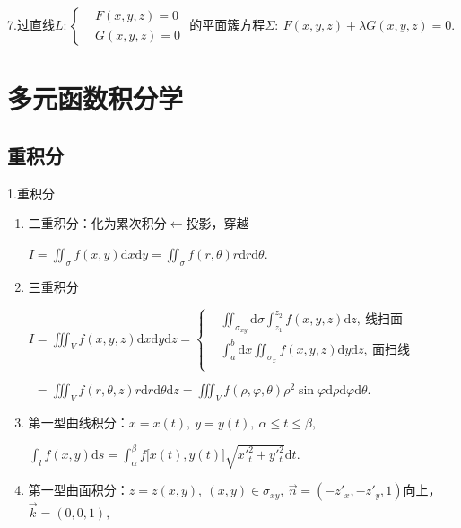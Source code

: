 \documentclass[UTF8]{ctexart}
\numberwithin{equation}{section}
\numberwithin{figure}{section}
\numberwithin{table}{section}
\newcommand\dif{\mathrm{d}}
\newcommand\no{\noindent}
\newcommand\dis{\displaystyle}
\newcommand\ls{\leqslant}
\newcommand\intd{\dis\int}
\begin{document}
\begin{spacing}{2}
\vspace{0.3cm}

\no7.过直线$L:
\left\{\begin{aligned}
&F(x,y,z)=0\\
&G(x,y,z)=0
\end{aligned}\right.$
的平面簇方程$\Sigma:\ F(x,y,z)+\lambda G(x,y,z)=0.$

\newpage

\section{多元函数积分学}

\subsection{重积分}

\no1.重积分

\begin{enumerate}[itemindent=1.4em, label=(\arabic*)]

\item 二重积分：化为累次积分$\longleftarrow$投影，穿越

\centerline{$I=\dis\iint_\sigma f(x,y)\dif x\dif y=\iint_\sigma f(r,\theta)r\dif r\dif\theta$.}

\item 三重积分

$I=\dis\iiint_Vf(x,y,z)\dif x\dif y\dif z
=\left\{\begin{aligned}
&\iint_{\sigma_{xy}}\dif\sigma\intd_{z_1}^{z_2}f(x,y,z)\dif z,\ \text{线扫面}\\
&\int_a^b\dif x\iint_{\sigma_x}f(x,y,z)\dif y\dif z,\ \text{面扫线}\\
\end{aligned}\right.$

\vspace{0.3cm}

$\ \ =\dis\iiint_Vf(r,\theta,z)r\dif r\dif \theta\dif z
=\dis\iiint_Vf(\rho,\varphi,\theta)\rho^2\sin\varphi\dif \rho\dif \varphi\dif \theta.$

\item 第一型曲线积分：$x=x(t),\ y=y(t),\ \alpha\ls t\ls\beta,$

\centerline{$\intd_l f(x,y)\dif s
=\intd_\alpha^\beta f\big[x(t),y(t)\big]\sqrt{x'^2_t+y'^2_t}\dif t.$}

\item 第一型曲面积分：$z=z(x,y),\ (x,y)\in\sigma_{xy},\ \stackrel{\rightarrow}{n}
=\left(-z'_x,-z'_y,1\right)$向上，$\stackrel{\rightarrow}{k}=(0,0,1),$


\end{enumerate}
\end{spacing}
\end{document}
